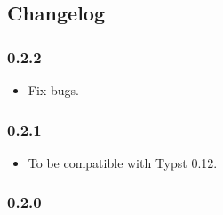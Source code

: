 \subsection{Changelog}\label{changelog}

\subsubsection{0.2.2}\label{section}

\begin{itemize}
\tightlist
\item
  Fix bugs.
\end{itemize}

\subsubsection{0.2.1}\label{section-1}

\begin{itemize}
\tightlist
\item
  To be compatible with Typst 0.12.
\end{itemize}

\subsubsection{0.2.0}\label{section-2}

